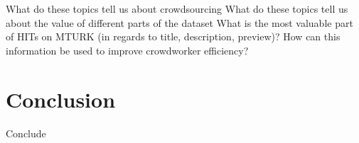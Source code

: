\documentclass[letterpaper,12pt]{article}
\begin{document}
What do these topics tell us about crowdsourcing
What do these topics tell us about the value of different parts of the dataset
What is the most valuable part of HITs on MTURK (in regards to title, description, preview)?
How can this information be used to improve crowdworker efficiency?

\chapter{Conclusion}
Conclude
\end{document}
